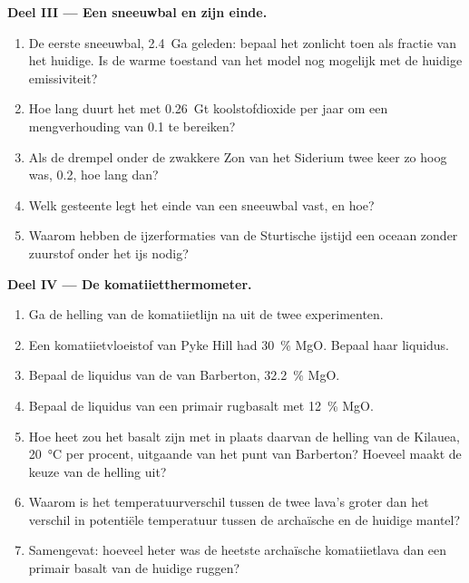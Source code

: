 \begin{problem}
\noindent\textbf{Deel III --- Een sneeuwbal en zijn einde.}
\begin{enumerate}[resume]
  \item De eerste sneeuwbal, \qty{2.4}{Ga} geleden: bepaal het zonlicht toen als fractie van het huidige.
        Is de warme toestand van het model nog mogelijk met de huidige emissiviteit?
  \item Hoe lang duurt het met \qty{0.26}{Gt} koolstofdioxide per jaar om een
        mengverhouding van 0.1 te bereiken?
  \item Als de drempel onder de zwakkere Zon van het Siderium twee keer zo hoog was, 0.2, hoe lang dan?
  \item Welk gesteente legt het einde van een sneeuwbal vast, en hoe?
  \item Waarom hebben de ijzerformaties van de Sturtische ijstijd een oceaan zonder zuurstof onder het ijs nodig?
\end{enumerate}

\noindent\textbf{Deel IV --- De komatiietthermometer.}
\begin{enumerate}[resume]
  \item Ga de helling van de komatiietlijn na uit de twee experimenten.
  \item Een komatiietvloeistof van Pyke Hill had \qty{30}{\percent} MgO. Bepaal haar liquidus.
  \item Bepaal de liquidus van de  van Barberton, \qty{32.2}{\percent} MgO.
  \item Bepaal de liquidus van een primair rugbasalt met \qty{12}{\percent} MgO.
  \item Hoe heet zou het basalt zijn met in plaats daarvan de helling van de Kilauea, \qty{20}{\celsius} per procent,
        uitgaande van het punt van Barberton? Hoeveel maakt de keuze van de helling uit?
  \item Waarom is het temperatuurverschil tussen de twee lava's groter dan het verschil in
        potentiële temperatuur tussen de archaïsche en de huidige mantel?
  \item Samengevat: hoeveel heter was de heetste archaïsche komatiietlava dan een primair basalt
        van de huidige ruggen?
\end{enumerate}
\end{problem}
